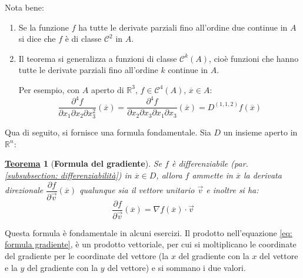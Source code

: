 \documentclass[a4paper]{article}
\newtheorem{theorem}{\textcolor{Red3}{\underline{Teorema}}}
\begin{document}
	\noindent
	Nota bene:
	\begin{enumerate}
		\item Se la funzione $f$ ha tutte le derivate parziali fino all'ordine due continue in $A$ si dice che $f$ è di classe $\mathcal{C}^{2}$ in $A$.

		\item Il teorema si generalizza a funzioni di classe $\mathcal{C}^{k}\left(A\right)$, cioè funzioni che hanno tutte le derivate parziali fino all'ordine $k$ continue in $A$.
		
		Per esempio, con $A$ aperto di $\mathbb{R}^{3}$, $f \in \mathcal{C}^{4}\left(A\right)$, $\overline{x} \in A$:
		\begin{equation*}
			\dfrac{\partial^{4} f}{\partial x_{1} \partial x_{2} \partial x_{3}^{2}}\left(\overline{x}\right)
			=
			\dfrac{\partial^{4} f}{\partial x_{2} \partial x_{3} \partial x_{1} \partial x_{3}}\left(\overline{x}\right)
			=
			D^{\left(1,1,2\right)}f\left(\overline{x}\right)
		\end{equation*}
	\end{enumerate}
	Qua di seguito, si fornisce una formula fondamentale. Sia $D$ un insieme aperto in $\mathbb{R}^{n}$:
	\begin{theorem}[\textbf{Formula del gradiente}]
		Se $f$ è differenziabile (par. \ref{subsubsection: differenziabilità}) in $\overline{x} \in D$, allora $f$ ammette in $\overline{x}$ la derivata direzionale $\dfrac{\partial f}{\partial \overrightarrow{v}}\left(\overline{x}\right)$ qualunque sia il vettore unitario $\overrightarrow{v}$ e inoltre si ha:
		\begin{equation}\label{eq: formula gradiente}
			\dfrac{\partial f}{\partial \overrightarrow{v}}\left(\overline{x}\right) = \nabla f\left(\overline{x}\right)\cdot \overrightarrow{v}
		\end{equation}
	\end{theorem}

	\noindent
	Questa formula è fondamentale in alcuni esercizi. Il prodotto nell'equazione \ref{eq: formula gradiente}, è un prodotto vettoriale, per cui si moltiplicano le coordinate del gradiente per le coordinate del vettore (la $x$ del gradiente con la $x$ del vettore e la $y$ del gradiente con la $y$ del vettore) e si sommano i due valori.\newline
\end{document}

